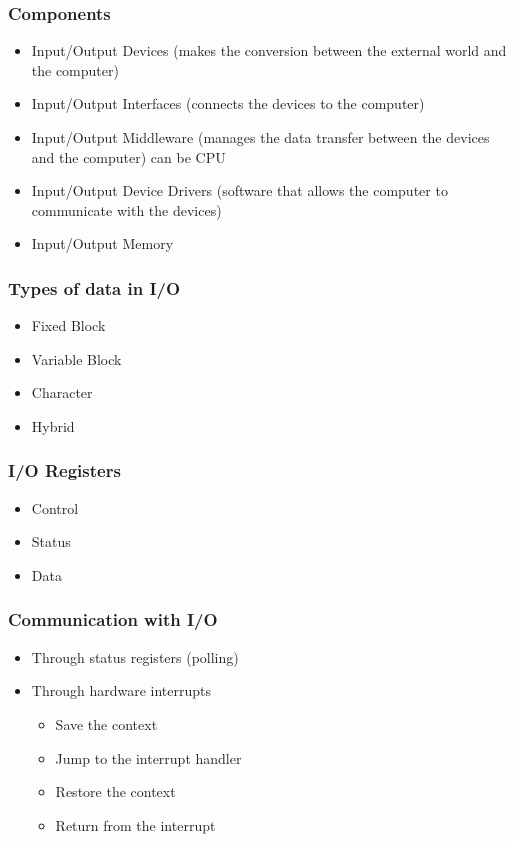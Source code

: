 \begin{frame}
    \frametitle{Components}
    \begin{itemize}
        \item Input/Output Devices (makes the conversion between the external world and the computer)
        \item Input/Output Interfaces (connects the devices to the computer)
        \item Input/Output Middleware (manages the data transfer between the devices and the computer) can be CPU
        \item Input/Output Device Drivers (software that allows the computer to communicate with the devices)
        \item Input/Output Memory
    \end{itemize}
\end{frame}

\begin{frame}
    \frametitle{Types of data in I/O}
    \begin{itemize}
        \item Fixed Block
        \item Variable Block
        \item Character
        \item Hybrid
    \end{itemize}
\end{frame}

\begin{frame}
    \frametitle{I/O Registers}
    \begin{itemize}
        \item Control
        \item Status
        \item Data
    \end{itemize}
\end{frame}

\begin{frame}
    \frametitle{Communication with I/O}
    \begin{itemize}
        \item Through status registers (polling)
        \item Through hardware interrupts
        \begin{itemize}
            \item Save the context
            \item Jump to the interrupt handler
            \item Restore the context
            \item Return from the interrupt
        \end{itemize}
    \end{itemize}
\end{frame}
